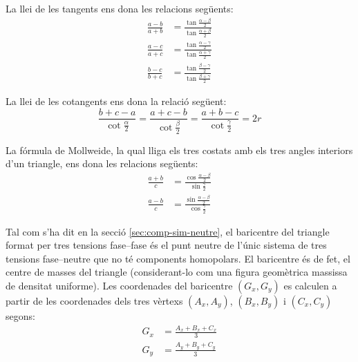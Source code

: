 La llei de les tangents ens dona les relacions següents:
\begin{subequations}
\begin{align}
    \frac{a-b}{a+b} &= \frac{\tan\frac{\alpha-\beta}{2}}{\tan\frac{\alpha+\beta}{2}} \\[1ex]
    \frac{a-c}{a+c} &= \frac{\tan\frac{\alpha-\gamma}{2}}{\tan\frac{\alpha+\gamma}{2}} \\[1ex]
    \frac{b-c}{b+c} &= \frac{\tan\frac{\beta-\gamma}{2}}{\tan\frac{\beta+\gamma}{2}}
\end{align}
\end{subequations}

La llei de les cotangents ens dona la relació següent:
\begin{equation}
    \frac{b+c-a}{\cot\frac{\alpha}{2}} = \frac{a+c-b}{\cot\frac{\beta}{2}} =
    \frac{a+b-c}{\cot\frac{\gamma}{2}} = 2 r
\end{equation}

La fórmula de Mollweide, la qual lliga els tres costats amb els tres angles interiors d'un triangle, ens dona les relacions següents:
\begin{subequations}
\begin{align}
    \frac{a+b}{c} &= \frac{\cos\frac{\alpha-\beta}{2}}{\sin\frac{\gamma}{2}} \\[1ex]
    \frac{a-b}{c} &= \frac{\sin\frac{\alpha-\beta}{2}}{\cos\frac{\gamma}{2}}
\end{align}
\end{subequations}

Tal com s'ha dit en la secció \vref{sec:comp-sim-neutre}, el baricentre del triangle format per tres tensions fase--fase és el punt neutre de l'únic sistema de tres tensions fase--neutre que no té components homopolars. El baricentre és de fet, el centre de masses del triangle (considerant-lo com una figura geomètrica massissa de densitat uniforme).  Les coordenades del baricentre $(G_x,G_y)$ es calculen a partir de les coordenades dels tres vèrtexs $(A_x,A_y)$, $(B_x,B_y)$ i $(C_x,C_y)$ segons:
\begin{subequations}
\begin{align}
    G_x &= \frac{A_x + B_x + C_x}{3} \label{eq:bari_x}\\[1ex]
    G_y &= \frac{A_y + B_y + C_y}{3} \label{eq:bari_y}
\end{align}
\end{subequations}

